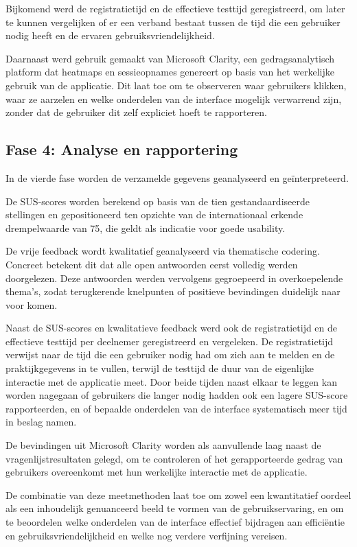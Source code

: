 Bijkomend werd de registratietijd en de effectieve testtijd geregistreerd, om later te kunnen vergelijken of 
er een verband bestaat tussen de tijd die een gebruiker nodig heeft en de ervaren gebruiksvriendelijkheid.
\medskip

Daarnaast werd gebruik gemaakt van Microsoft Clarity, een gedragsanalytisch platform dat 
heatmaps en sessieopnames genereert op basis van het werkelijke gebruik van de applicatie. 
Dit laat toe om te observeren waar gebruikers klikken, waar ze aarzelen en welke 
onderdelen van de interface mogelijk verwarrend zijn, zonder dat de gebruiker dit zelf 
expliciet hoeft te rapporteren.

\subsection{Fase 4: Analyse en rapportering}
\label{ter:analyse}
In de vierde fase worden de verzamelde gegevens geanalyseerd en 
geïnterpreteerd.
\medskip

De SUS-scores worden berekend op basis van de tien gestandaardiseerde 
stellingen en gepositioneerd ten opzichte van de internationaal erkende 
drempelwaarde van 75, die geldt als indicatie voor goede usability.
\medskip

De vrije feedback wordt kwalitatief geanalyseerd via thematische codering. 
Concreet betekent dit dat alle open antwoorden eerst volledig werden 
doorgelezen. Deze antwoorden werden vervolgens gegroepeerd in overkoepelende 
thema's, zodat terugkerende knelpunten of positieve bevindingen duidelijk 
naar voor komen.
\medskip

Naast de SUS-scores en kwalitatieve feedback werd ook de registratietijd 
en de effectieve testtijd per deelnemer geregistreerd en vergeleken. 
De registratietijd verwijst naar de tijd die een gebruiker nodig had om 
zich aan te melden en de praktijkgegevens in te vullen, terwijl de 
testtijd de duur van de eigenlijke interactie met de applicatie meet. 
Door beide tijden naast elkaar te leggen kan worden nagegaan of gebruikers 
die langer nodig hadden ook een lagere SUS-score rapporteerden, en of 
bepaalde onderdelen van de interface systematisch meer tijd in beslag namen.
\medskip

De bevindingen uit Microsoft Clarity worden als aanvullende laag naast de 
vragenlijstresultaten gelegd, om te controleren of het gerapporteerde gedrag 
van gebruikers overeenkomt met hun werkelijke interactie met de applicatie.
\medskip

De combinatie van deze meetmethoden laat toe om zowel een kwantitatief 
oordeel als een inhoudelijk genuanceerd beeld te vormen van de 
gebruikservaring, en om te beoordelen welke onderdelen van de interface 
effectief bijdragen aan efficiëntie en gebruiksvriendelijkheid en welke 
nog verdere verfijning vereisen.